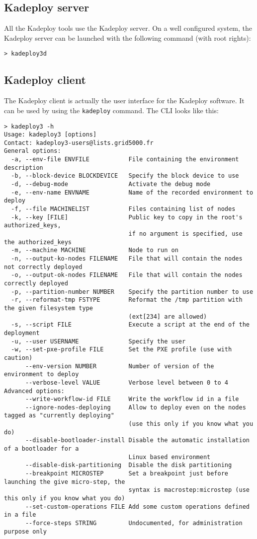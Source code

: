 \documentclass[a4wide,10pt,oneside]{book}
\begin{document}
\subsection{Kadeploy server}
All the Kadeploy tools use the Kadeploy server. On a well configured system, the Kadeploy server can be launched with the following command (with root rights):
\begin{verbatim}
> kadeploy3d
\end{verbatim}

\subsection{Kadeploy client}
The Kadeploy client is actually the user interface for the Kadeploy software. It can be used by using the \texttt{kadeploy} command. The CLI looks like this:
\begin{small}
\begin{verbatim}
> kadeploy3 -h
Usage: kadeploy3 [options]
Contact: kadeploy3-users@lists.grid5000.fr
General options:
  -a, --env-file ENVFILE           File containing the environment description
  -b, --block-device BLOCKDEVICE   Specify the block device to use
  -d, --debug-mode                 Activate the debug mode
  -e, --env-name ENVNAME           Name of the recorded environment to deploy
  -f, --file MACHINELIST           Files containing list of nodes
  -k, --key [FILE]                 Public key to copy in the root's authorized_keys, 
                                   if no argument is specified, use the authorized_keys
  -m, --machine MACHINE            Node to run on
  -n, --output-ko-nodes FILENAME   File that will contain the nodes not correctly deployed
  -o, --output-ok-nodes FILENAME   File that will contain the nodes correctly deployed
  -p, --partition-number NUMBER    Specify the partition number to use
  -r, --reformat-tmp FSTYPE        Reformat the /tmp partition with the given filesystem type
                                   (ext[234] are allowed)
  -s, --script FILE                Execute a script at the end of the deployment
  -u, --user USERNAME              Specify the user
  -w, --set-pxe-profile FILE       Set the PXE profile (use with caution)
      --env-version NUMBER         Number of version of the environment to deploy
      --verbose-level VALUE        Verbose level between 0 to 4
Advanced options:
      --write-workflow-id FILE     Write the workflow id in a file
      --ignore-nodes-deploying     Allow to deploy even on the nodes tagged as "currently deploying" 
                                   (use this only if you know what you do)
      --disable-bootloader-install Disable the automatic installation of a bootloader for a 
                                   Linux based environment
      --disable-disk-partitioning  Disable the disk partitioning
      --breakpoint MICROSTEP       Set a breakpoint just before launching the give micro-step, the 
                                   syntax is macrostep:microstep (use this only if you know what you do)
      --set-custom-operations FILE Add some custom operations defined in a file
      --force-steps STRING         Undocumented, for administration purpose only


\end{verbatim}
\end{small}
\end{document}
